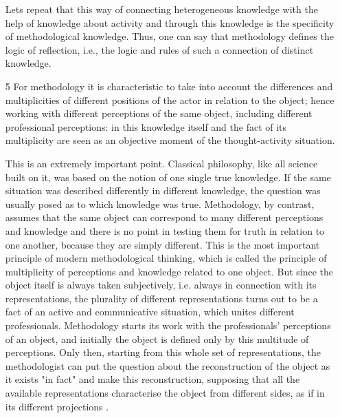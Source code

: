 \documentclass[11pt,a4paper]{article}
\begin{document}
\begin{itemize}
  Lets repeat that this way of connecting heterogeneous knowledge with the
  help of knowledge about activity and through this knowledge is the
  specificity of methodological knowledge. Thus, one can say that methodology
  defines the logic of reflection, i.e., the logic and rules of such a
  connection of distinct knowledge.

\item[5] For methodology it is characteristic to take into account the
  differences and multiplicities of different positions of the actor in
  relation to the object; hence working with different perceptions of the
  same object, including different professional perceptions: in this knowledge
  itself and the fact of its multiplicity are seen as an objective moment of
  the thought-activity situation.
  
  This is an extremely important point. Classical philosophy, like all science
  built on it, was based on the notion of one single true knowledge. If the
  same situation was described differently in different knowledge, the
  question was usually posed as to which knowledge was true. Methodology, by
  contrast, assumes that the same object can correspond to many different
  perceptions and knowledge and there is no point in testing them for truth in
  relation to one another, because they are simply different. This is the most
  important principle of modern methodological thinking, which is called the
  principle of multiplicity of perceptions and knowledge related to one
  object. But since the object itself is always taken subjectively, i.e.
  always in connection with its representations, the plurality of different
  representations turns out to be a fact of an active and communicative
  situation, which unites different professionals. Methodology starts its work
  with the professionals' perceptions of an object, and initially the object
  is defined only by this multitude of perceptions. Only then, starting from
  this whole set of representations, the methodologist can put the question
  about the reconstruction of the object as it exists "in fact" and make this
  reconstruction, supposing that all the available representations
  characterise the object from different sides, as if in its different
  projections \cite{Shchedrovitsky1964a, Shchedrovitsky1964h,
    Shchedrovitsky1971i}.
  

\end{itemize}
\end{document}
